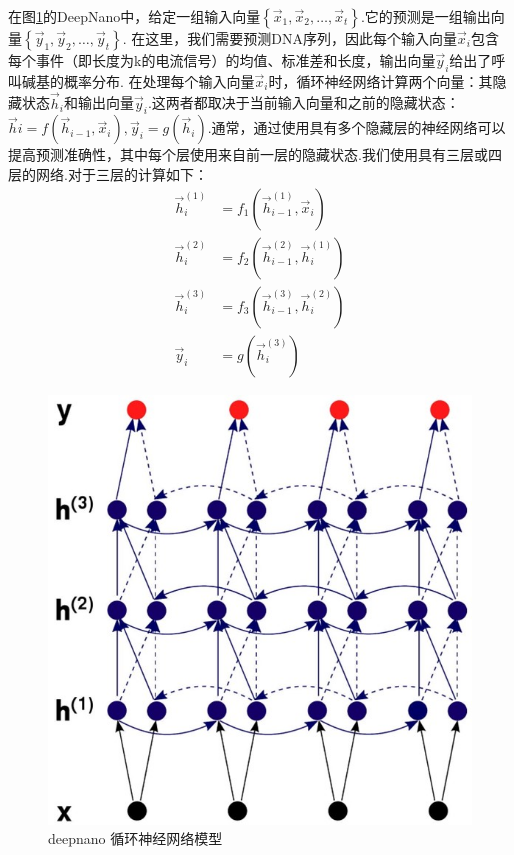 在图\ref{deepnano}的DeepNano中，给定一组输入向量$\left\{\vec{x}_1, \vec{x}_2, \ldots, \vec{x}_t\right\}$.它的预测是一组输出向量$\left\{\vec{y}_1, \vec{y}_2, \ldots, \vec{y}_t\right\}$. 在这里，我们需要预测DNA序列，因此每个输入向量$\vec{x}_i$包含每个事件（即长度为k的电流信号）的均值、标准差和长度，输出向量$\vec{y}_i$给出了呼叫碱基的概率分布.
在处理每个输入向量$\vec{x}_i$时，循环神经网络计算两个向量：其隐藏状态$\vec{h}_i$和输出向量$\vec{y}_i$.这两者都取决于当前输入向量和之前的隐藏状态：$\vec{h}i=f\left(\vec{h}_{i-1}, \vec{x}_i\right), \vec{y}_i=g\left(\vec{h}_i\right)$.通常，通过使用具有多个隐藏层的神经网络可以提高预测准确性，其中每个层使用来自前一层的隐藏状态.我们使用具有三层或四层的网络.对于三层的计算如下：
$$
\begin{aligned}
	\vec{h}_i^{(1)} & =f_1\left(\vec{h}_{i-1}^{(1)}, \vec{x}_i\right) \\
	\vec{h}_i^{(2)} & =f_2\left(\vec{h}_{i-1}^{(2)}, \vec{h}_i^{(1)}\right) \\
	\vec{h}_i^{(3)} & =f_3\left(\vec{h}_{i-1}^{(3)}, \vec{h}_i^{(2)}\right) \\
	\vec{y}_i & =g\left(\vec{h}_i^{(3)}\right)
\end{aligned}
$$



\begin{figure}[htp!]
	\centering
	\includegraphics[width=0.8\linewidth]{figure/deepnano}
	\caption{deepnano 循环神经网络模型 \cite{bovza2017deepnano}} \label{deepnano}
\end{figure}



